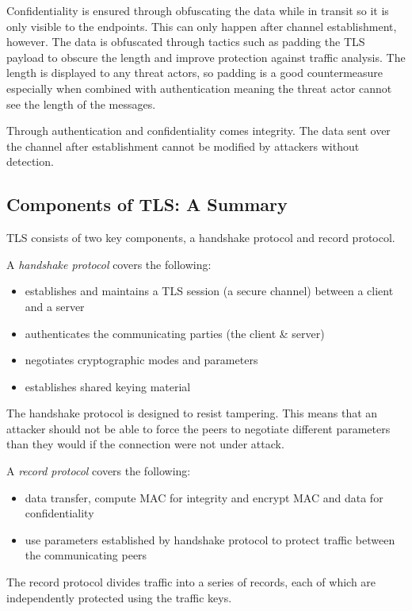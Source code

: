 Confidentiality is ensured through obfuscating the data while in transit so it is only visible to the endpoints. This can only happen after channel establishment, however. The data is obfuscated through tactics such as padding the TLS payload to obscure the length and improve protection against traffic analysis. The length is displayed to any threat actors, so padding is a good countermeasure especially when combined with authentication meaning the threat actor cannot see the length of the messages.

Through authentication and confidentiality comes integrity. The data sent over the channel after establishment cannot be modified by attackers without detection. 

\subsection{Components of TLS: A Summary}
TLS consists of two key components, a handshake protocol and record protocol.

A \textit{handshake protocol} covers the following:
\begin{itemize}
    \item establishes and maintains a TLS session (a secure channel) between a client and a server
    \item authenticates the communicating parties (the client \& server)
    \item negotiates cryptographic modes and parameters
    \item establishes shared keying material
\end{itemize}

The handshake protocol is designed to resist tampering. This means that an attacker should not be able to force the peers to negotiate different parameters than they would if the connection were not under attack.

A \textit{record protocol} covers the following:
\begin{itemize}
    \item data transfer, compute MAC for integrity and encrypt MAC and data for confidentiality
    \item use parameters established by handshake protocol to protect traffic between the communicating peers
\end{itemize}

The record protocol divides traffic into a series of records, each of which are independently protected using the traffic keys.

